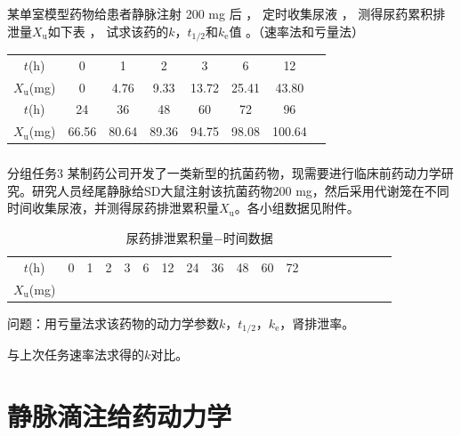 \documentclass[dvipsnames, svgnames, x11names]{beamer}
\begin{document}
\begin{frame}[t]
    \frametitle{}
\begin{question}
    某单室模型药物给患者静脉注射 200 mg 后 ， 定时收集尿液 ， 测得尿药累积排泄量$X_{\mathrm{u}}$如下表 ， 试求该药的$k$，$t_{1/2}$和$k_\mathrm{e}$值 。（速率法和亏量法）
        \begin{table}
            \centering
            \begin{tabular}{cccccccc}
                \bottomrule
                $t$(h)& 0 & 1 &  2 & 3 & 6 &  12\\ 
                $X_{\mathrm{u}}$(mg)& 0 & 4.76 & 9.33 & 13.72 & 25.41 & 43.80 \\ \hline
                $t$(h)& 24 & 36 & 48  & 60 & 72 & 96 \\ 
                $X_{\mathrm{u}}$(mg) & 66.56 & 80.64 & 89.36 & 94.75 & 98.08 & 100.64 \\ \toprule
            \end{tabular}
        \end{table}
\end{question}
\end{frame}


\begin{frame}[t]
    \frametitle{}
    \begin{redblock}{分组任务3}
        某制药公司开发了一类新型的抗菌药物，现需要进行临床前药动力学研究。研究人员经尾静脉给SD大鼠注射该抗菌药物200 mg，然后采用代谢笼在不同时间收集尿液，并测得尿药排泄累积量$X_\mathrm{u}$。各小组数据见附件。
        \begin{table}
            \centering
            \caption{尿药排泄累积量$-$时间数据}
            \begin{tabular}{ccccccccccccccccccc}
                \bottomrule
                $t$(h) & 0 & 1 &  2 & 3 & 6 &  12 & 24 & 36 & 48  & 60 & 72 \\
                $X_{\mathrm{u}}$(mg) &  &  &   &  &  &  &  &  &  &  &   \\  \toprule
            \end{tabular}
        \end{table}
        问题：用亏量法求该药物的动力学参数$k$，$t_{1/2}$，$k_\mathrm{e}$，肾排泄率。

        与上次任务速率法求得的$k$对比。
    \end{redblock}
\end{frame}


\section{静脉滴注给药动力学}
\end{document}

